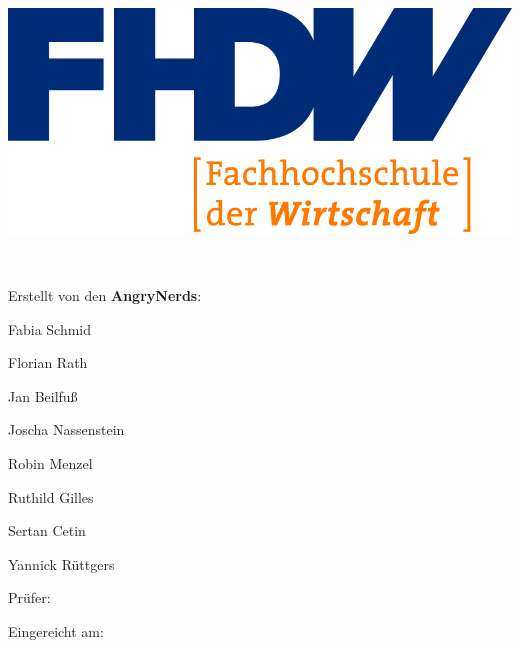 
\begin{titlepage}

\begin{center}


\includegraphics[scale=1.20]{img/fhdw}\\

\vspace{.05cm}

\Huge{\bfseries\dokumententyp}


\LARGE{\dokumententitel}

~\vspace{.05cm}\\

\large{

Erstellt von den \textbf{AngryNerds}:\\\vspace{1mm}

Fabia Schmid

Florian Rath

Jan Beilfuß

Joscha Nassenstein

Robin Menzel

Ruthild Gilles

Sertan Cetin

Yannick Rüttgers


\vspace{.5cm}

Prüfer:\vspace{1mm}\\

\dokumentenpruefer


\vspace{.5cm}

Eingereicht am:\vspace{1mm}\\

\abgabedatum

}

\end{center}


\end{titlepage}

